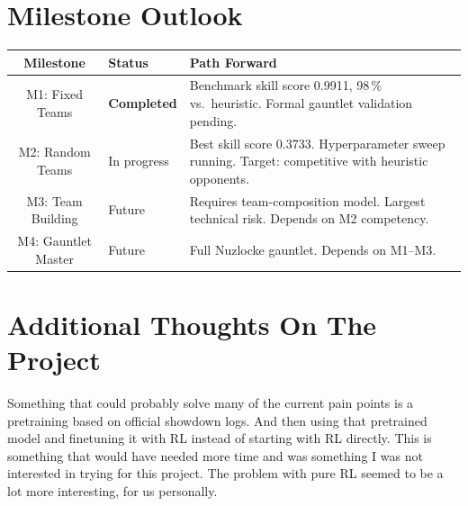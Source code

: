 \section{Milestone Outlook}

\begin{center}
\small
\begin{tabularx}{\textwidth}{c l X}
  \toprule
  \textbf{Milestone} & \textbf{Status} & \textbf{Path Forward} \\
  \midrule
  M1: Fixed Teams & \textbf{Completed} &
    Benchmark skill score 0.9911, 98\,\% vs.\ heuristic.
    Formal gauntlet validation pending. \\
  M2: Random Teams & In progress &
    Best skill score 0.3733.  Hyperparameter sweep running.
    Target: competitive with heuristic opponents. \\
  M3: Team Building & Future &
    Requires team-composition model.  Largest technical risk.
    Depends on M2 competency. \\
  M4: Gauntlet Master & Future &
    Full Nuzlocke gauntlet.  Depends on M1--M3. \\
  \bottomrule
\end{tabularx}
\end{center}

\section{Additional Thoughts On The Project}

Something that could probably solve many of the current pain points is a pretraining based on official showdown logs. And then using that pretrained model and finetuning it with RL instead of starting with RL directly. This is something that would have needed more time and was something I was not interested in trying for this project. The problem with pure RL seemed to be a lot more interesting, for us personally.

